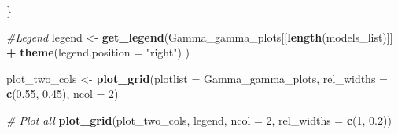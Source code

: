 \documentclass[
]{article}
\newenvironment{Shaded}{\begin{snugshade}}{\end{snugshade}}
\newcommand{\AttributeTok}[1]{\textcolor[rgb]{0.13,0.29,0.53}{#1}}
\newcommand{\CommentTok}[1]{\textcolor[rgb]{0.56,0.35,0.01}{\textit{#1}}}
\newcommand{\DecValTok}[1]{\textcolor[rgb]{0.00,0.00,0.81}{#1}}
\newcommand{\FloatTok}[1]{\textcolor[rgb]{0.00,0.00,0.81}{#1}}
\newcommand{\FunctionTok}[1]{\textcolor[rgb]{0.13,0.29,0.53}{\textbf{#1}}}
\newcommand{\NormalTok}[1]{#1}
\newcommand{\OtherTok}[1]{\textcolor[rgb]{0.56,0.35,0.01}{#1}}
\newcommand{\SpecialCharTok}[1]{\textcolor[rgb]{0.81,0.36,0.00}{\textbf{#1}}}
\newcommand{\StringTok}[1]{\textcolor[rgb]{0.31,0.60,0.02}{#1}}
\begin{document}
\begin{Shaded}
\begin{Highlighting}[]
\NormalTok{\}}

\CommentTok{\#Legend}
\NormalTok{legend }\OtherTok{\textless{}{-}} \FunctionTok{get\_legend}\NormalTok{(Gamma\_gamma\_plots[[}\FunctionTok{length}\NormalTok{(models\_list)]] }\SpecialCharTok{+}
                       \FunctionTok{theme}\NormalTok{(}\AttributeTok{legend.position =} \StringTok{"right"}\NormalTok{)}
\NormalTok{                     )}

\NormalTok{plot\_two\_cols }\OtherTok{\textless{}{-}} \FunctionTok{plot\_grid}\NormalTok{(}\AttributeTok{plotlist =}\NormalTok{ Gamma\_gamma\_plots, }
                           \AttributeTok{rel\_widths =} \FunctionTok{c}\NormalTok{(}\FloatTok{0.55}\NormalTok{, }\FloatTok{0.45}\NormalTok{),}
                           \AttributeTok{ncol =} \DecValTok{2}\NormalTok{)}


\CommentTok{\# Plot all}
\FunctionTok{plot\_grid}\NormalTok{(plot\_two\_cols,}
\NormalTok{          legend,}
          \AttributeTok{ncol =} \DecValTok{2}\NormalTok{,}
          \AttributeTok{rel\_widths =} \FunctionTok{c}\NormalTok{(}\DecValTok{1}\NormalTok{, }\FloatTok{0.2}\NormalTok{))}
\end{Highlighting}
\end{Shaded}
\end{document}
